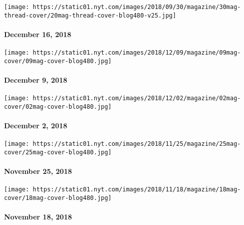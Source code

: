 \texttt{[image: https://static01.nyt.com/images/2018/09/30/magazine/30mag-thread-cover/20mag-thread-cover-blog480-v25.jpg]}

\hypertarget{december-16-2018}{%
\paragraph{December 16, 2018}\label{december-16-2018}}

\href{https://www.nytimes.com/issue/magazine/2018/12/07/the-12918-issue}{}

\texttt{[image: https://static01.nyt.com/images/2018/12/09/magazine/09mag-cover/09mag-cover-blog480.jpg]}

\hypertarget{december-9-2018}{%
\paragraph{December 9, 2018}\label{december-9-2018}}

\href{https://www.nytimes.com/issue/magazine/2018/12/07/the-12218-issue}{}

\texttt{[image: https://static01.nyt.com/images/2018/12/02/magazine/02mag-cover/02mag-cover-blog480.jpg]}

\hypertarget{december-2-2018}{%
\paragraph{December 2, 2018}\label{december-2-2018}}

\href{https://www.nytimes.com/issue/magazine/2018/11/21/the-112518-issue}{}

\texttt{[image: https://static01.nyt.com/images/2018/11/25/magazine/25mag-cover/25mag-cover-blog480.jpg]}

\hypertarget{november-25-2018}{%
\paragraph{November 25, 2018}\label{november-25-2018}}

\href{https://www.nytimes.com/issue/magazine/2018/11/16/the-111818-issue}{}

\texttt{[image: https://static01.nyt.com/images/2018/11/18/magazine/18mag-cover/18mag-cover-blog480.jpg]}

\hypertarget{november-18-2018}{%
\paragraph{November 18, 2018}\label{november-18-2018}}

